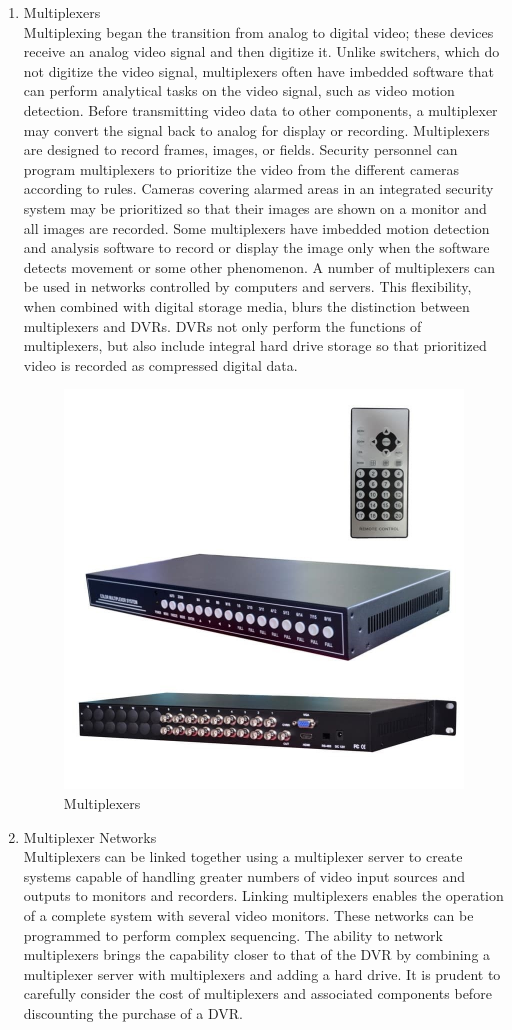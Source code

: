 \documentclass[12pt,fleqn]{book} %
\begin{document}
\begin{enumerate}
     \item Multiplexers 
     \\Multiplexing began the transition from analog to digital video; these devices receive an analog video signal and then digitize it. Unlike switchers, which do not digitize the video signal, multiplexers often have imbedded software that can perform analytical tasks on the video signal, such as video motion detection. Before transmitting video data to other components, a multiplexer may convert the signal back to analog for display or recording. Multiplexers are designed to record frames, images, or fields. Security personnel can program multiplexers to prioritize the video from the different cameras according to rules. Cameras covering alarmed areas in an integrated security system may be prioritized so that their images are shown on a monitor and all images are recorded. Some multiplexers have imbedded motion detection and analysis software to record or display the image only when the software detects movement or some other phenomenon. A number of multiplexers can be used in networks controlled by computers and servers. This flexibility, when combined with digital storage media, blurs the distinction between multiplexers and DVRs. DVRs not only perform the functions of multiplexers, but also include integral hard drive storage so that prioritized video is recorded as compressed digital data.
                     \begin{figure}[!h]
    \centering
    \includegraphics[width=0.5\linewidth]{c 14.jpg}
    \caption{Multiplexers}
    \label{fig:c 14}
    \end{figure}
      \item Multiplexer Networks 
      \\Multiplexers can be linked together using a multiplexer server to create systems capable of handling greater numbers of video input sources and outputs to monitors and recorders. Linking multiplexers enables the operation of a complete system with several video monitors. These networks can be programmed to perform complex sequencing. The ability to network multiplexers brings the capability closer to that of the DVR by combining a multiplexer server with multiplexers and adding a hard drive. It is prudent to carefully consider the cost of multiplexers and associated components before discounting the purchase of a DVR.

\end{enumerate}
\end{document}
